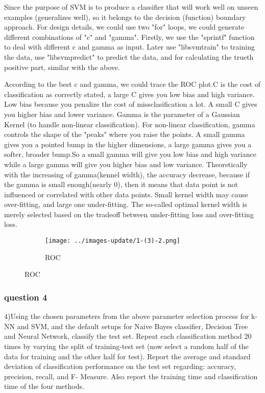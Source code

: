 \documentclass[]{article}
\begin{document}
Since the purpose of SVM is to produce a classifier that will work well on unseen examples (generalizes well), so it belongs to the decision (function) boundary approach. For design details, we could use two "for" loops, we could generate different combinations of "c" and "gamma". Firstly, we use the "sprintf" function to deal with different c and gamma as input. Later use "libsvmtrain" to training the data, use "libsvmpredict" to predict the data, and for calculating the trueth positive part, similar with the above.

According to the best c and gamma, we could trace the ROC plot.C is the cost of classification as correctly stated, a large C gives you low bias and high variance. Low bias because you penalize the cost of missclasification a lot. A small C gives you higher bias and lower variance. Gamma is the parameter of a Gaussian Kernel (to handle non-linear classification). For non-linear classification, gamma controls the shape of the "peaks" where you raise the points. A small gamma gives you a pointed bump in the higher dimensions, a large gamma gives you a softer, broader bump.So a small gamma will give you low bias and high variance while a large gamma will give you higher bias and low variance. Theoretically with the increasing of gamma(kennel width), the accuracy decrease, because if the gamma is small enough(nearly 0), then it means that data point is not influenced or correlated with other data points. Small kernel width may cause over-fitting, and large one under-fitting. The so-called optimal kernel width is merely selected based on the tradeoff between under-fitting loss and over-fitting loss. 


\begin{figure}[p]
	\centering
	\begin{subfigure}{.5\textwidth}
		\centering
		\texttt{[image: ../images-update/1-(3)-2.png]}
		\caption{ROC}
		\label{fig:sub1}
	\end{subfigure}
		 
\end{figure}




\subsubsection{question 4}
4)Using the chosen parameters from the above parameter selection process for k-NN and SVM, and the default setups for Naive Bayes classifier, Decision Tree and Neural Network, classify the test set. Repeat each classification method 20 times by varying the split of training-test set (now select a random half of the data for training and the other half for test). Report the average and standard deviation of classification performance on the test set regarding: accuracy, precision, recall, and F- Measure. Also report the training time and classification time of the four methods.
\end{document}
